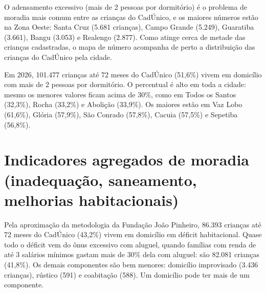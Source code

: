 O adensamento excessivo (mais de 2 pessoas por dormitório) é o problema de moradia mais comum entre as crianças do CadÚnico, e os maiores números estão na Zona Oeste: Santa Cruz (5.681 crianças), Campo Grande (5.249), Guaratiba (3.661), Bangu (3.053) e Realengo (2.877). Como atinge cerca de metade das crianças cadastradas, o mapa de número acompanha de perto a distribuição das crianças do CadÚnico pela cidade.


Em 2026, 101.477 crianças até 72 meses do CadÚnico (51,6\%) vivem em domicílio com mais de 2 pessoas por dormitório. O percentual é alto em toda a cidade: mesmo os menores valores ficam acima de 30\%, como em Todos os Santos (32,3\%), Rocha (33,2\%) e Abolição (33,9\%). Os maiores estão em Vaz Lobo (61,6\%), Glória (57,9\%), São Conrado (57,8\%), Cacuia (57,5\%) e Sepetiba (56,8\%).


\section{Indicadores agregados de moradia (inadequação, saneamento, melhorias habitacionais)}


Pela aproximação da metodologia da Fundação João Pinheiro, 86.393 crianças até 72 meses do CadÚnico (43,2\%) vivem em domicílio em déficit habitacional. Quase todo o déficit vem do ônus excessivo com aluguel, quando famílias com renda de até 3 salários mínimos gastam mais de 30\% dela com aluguel: são 82.081 crianças (41,8\%). Os demais componentes são bem menores: domicílio improvisado (3.436 crianças), rústico (591) e coabitação (588). Um domicílio pode ter mais de um componente.

